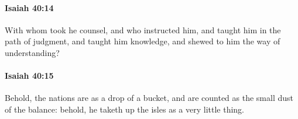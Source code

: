 		\paragraph{Isaiah 40:14} %
			\label{ISAIAH-40-14}

			With whom took he counsel, and who instructed him, and taught him in the path of judgment, and taught him knowledge, and shewed to him the way of understanding?


		\paragraph{Isaiah 40:15} %
			\label{ISAIAH-40-15}

			Behold, the nations are as a drop of a bucket, and are counted as the small dust of the balance: behold, he taketh up the isles as a very little thing.


